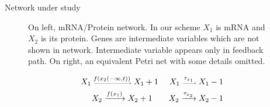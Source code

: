 \documentclass{beamer}
\begin{document}
\begin{textblock}{5}
\begin{block}{Network under study}
\begin{figure}
            
            
            \caption{\small On left, mRNA/Protein network. In
                our scheme $X_1$ is mRNA and $X_2$ is its protein. Genes are
                intermediate variables which are not shown in network.
                Intermediate variable appears only in feedback path. On right,
                an equivalent Petri net with some details omitted. }
            \label{fig:demon} \end{figure}



    \begin{eqnarray*}
        \tiny
            X_1 \xrightarrow{f(x_2(-\infty,t))} X_1 + 1 \qquad X_1 \xrightarrow{\tau_{x_1}} X_1 -1 \\
            X_2 \xrightarrow{f(x_1)} X_2 + 1 \qquad X_2 \xrightarrow{\tau_{x_2}} X_2 - 1
    \end{eqnarray*}

   
    \end{block}

\end{textblock}
\end{document}
